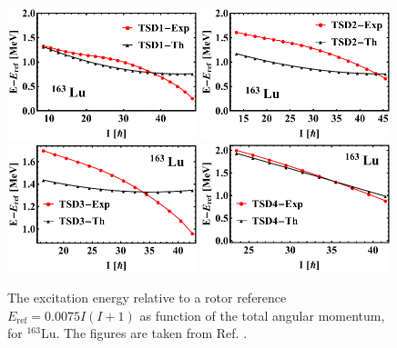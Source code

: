 \begin{figure}
    \centering
    \includegraphics[width=0.49\textwidth]{Chapters/Figures/Lu-exp-energies/fig12a_lu163.pdf}
    \includegraphics[width=0.49\textwidth]{Chapters/Figures/Lu-exp-energies/fig12b_lu163.pdf}
    \includegraphics[width=0.49\textwidth]{Chapters/Figures/Lu-exp-energies/fig12c_lu163.pdf}
    \includegraphics[width=0.49\textwidth]{Chapters/Figures/Lu-exp-energies/fig12d_lu163.pdf}
    \caption{The excitation energy relative to a rotor reference $E_\text{ref}=0.0075I(I+1)$ as function of the total angular momentum, for $^{163}$Lu. The figures are taken from Ref. \cite{raduta2020approach}.}
    \label{reference-rotor-energy-lu163}
\end{figure}

